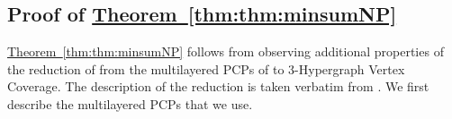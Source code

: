 \documentclass[10pt,a4paper]{amsart}
\newcommand{\namedref}[2]{\hyperref[#2]{#1~\ref*{#2}}}
\newcommand{\thmref}[1]{\namedref{Theorem}{thm:#1}}
\newcommand{\seclab}[1]{\label{sec:#1}}
\newcommand{\calm}{\mathcal{M}}
\begin{document}
\subsection{Proof of \texorpdfstring{\thmref{thm:minsumNP}}{Theorem (Min Sum NP)}}\seclab{sec:jchdb}


\thmref{thm:minsumNP} follows from observing additional properties of the reduction of \cite{Cohen-AddadSL22} from the multilayered PCPs of \cite{DGKR05, Khot02} to $3$-Hypergraph Vertex Coverage. The description of the reduction is taken verbatim from \cite{Cohen-AddadSL22}. We first describe the multilayered PCPs that we use. 
\end{document}
